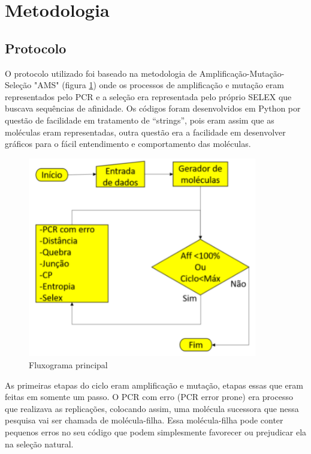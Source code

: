 \section{Metodologia}

\subsection{Protocolo}

O protocolo utilizado foi baseado na metodologia de Amplificação-Mutação-Seleção "AMS" (figura \ref{fig:fluxograma-principal}) onde os processos de amplificação e mutação eram representados pelo PCR e a seleção era representada pelo próprio SELEX que buscava sequências de afinidade. Os códigos foram desenvolvidos em Python por questão de facilidade em
tratamento de “strings”, pois eram assim que as moléculas eram representadas, outra questão era a facilidade em desenvolver gráficos para o fácil entendimento e comportamento das moléculas.

\begin{figure}[!h]
    \centering
    \includegraphics[width=10cm]{figures/img-fluxo1.png}
    \caption{Fluxograma principal}
    \label{fig:fluxograma-principal}
\end{figure}

As primeiras etapas do ciclo eram amplificação e mutação, etapas essas que eram
feitas em somente um passo. O PCR com erro (PCR error prone) era processo que
realizava as replicações, colocando assim, uma molécula sucessora que nessa pesquisa
vai ser chamada de molécula-filha. Essa molécula-filha pode conter pequenos erros no
seu código que podem simplesmente favorecer ou prejudicar ela na seleção natural.

